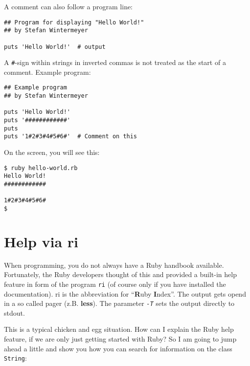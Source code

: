 \documentclass[a4paper]{book}
\newcommand{\chap}[1]{\newpage\thispagestyle{empty}\chapter{#1}\label{chap:\thechapter}}
\begin{document}
A comment can also follow a program line:

\begin{shaded}\begin{verbatim}
## Program for displaying "Hello World!"
## by Stefan Wintermeyer

puts 'Hello World!'  # output
\end{verbatim}\end{shaded}

A \texttt{\#}-sign within strings in inverted commas is not treated as the start of a comment. Example program:

\begin{shaded}\begin{verbatim}
## Example program
## by Stefan Wintermeyer

puts 'Hello World!'
puts '############'
puts
puts '1#2#3#4#5#6#'  # Comment on this
\end{verbatim}\end{shaded}

On the screen, you will see this:

\begin{shaded}\begin{verbatim}
$ ruby hello-world.rb
Hello World!
############

1#2#3#4#5#6#
$
\end{verbatim}\end{shaded}

\chap{Help via ri}\label{help-via-ri}

When programming, you do not always have a Ruby handbook available. Fortunately, the Ruby developers thought of this and provided a built-in help feature in form of the program \texttt{ri} (of course only if you have installed the documentation). ri is the abbreviation for “\textbf{R}uby \textbf{I}ndex”. The output gets opend in a so called pager (z.B. \textbf{less}). The parameter \emph{\texttt{-T}} sets the output directly to stdout.

This is a typical chicken and egg situation. How can I explain the Ruby help feature, if we are only just getting started with Ruby? So I am going to jump ahead a little and show you how you can search for information on the class \texttt{String}:
\end{document}
